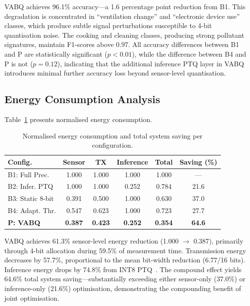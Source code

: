 VABQ achieves 96.1\% accuracy---a 1.6 percentage point reduction from B1. This degradation is concentrated in ``ventilation change'' and ``electronic device use'' classes, which produce subtle signal perturbations susceptible to 4-bit quantisation noise. The cooking and cleaning classes, producing strong pollutant signatures, maintain F1-scores above 0.97. All accuracy differences between B1 and P are statistically significant ($p < 0.01$), while the difference between B4 and P is not ($p = 0.12$), indicating that the additional inference PTQ layer in VABQ introduces minimal further accuracy loss beyond sensor-level quantisation.

\subsection{Energy Consumption Analysis}
\label{sec:res_energy}

Table~\ref{tab:energy} presents normalised energy consumption.

\begin{table}[H]
\centering
\caption{Normalised energy consumption and total system saving per configuration.}
\label{tab:energy}
\begin{tabular}{@{}lccccc@{}}
\toprule
\textbf{Config.} & \textbf{Sensor} & \textbf{TX} & \textbf{Inference} & \textbf{Total} & \textbf{Saving (\%)} \\
\midrule
B1: Full Prec.   & 1.000 & 1.000 & 1.000 & 1.000 & --- \\
B2: Infer. PTQ   & 1.000 & 1.000 & 0.252 & 0.784 & 21.6 \\
B3: Static 8-bit & 0.391 & 0.500 & 1.000 & 0.630 & 37.0 \\
B4: Adapt. Thr.  & 0.547 & 0.623 & 1.000 & 0.723 & 27.7 \\
\textbf{P: VABQ} & \textbf{0.387} & \textbf{0.423} & \textbf{0.252} & \textbf{0.354} & \textbf{64.6} \\
\bottomrule
\end{tabular}
\end{table}

VABQ achieves 61.3\% sensor-level energy reduction (1.000 $\rightarrow$ 0.387), primarily through 4-bit allocation during 59.5\% of measurement time. Transmission energy decreases by 57.7\%, proportional to the mean bit-width reduction (6.77/16 bits). Inference energy drops by 74.8\% from INT8 PTQ~\cite{smoothquant2024, palakodety2025tpu}. The compound effect yields 64.6\% total system saving---substantially exceeding either sensor-only (37.0\%) or inference-only (21.6\%) optimisation, demonstrating the compounding benefit of joint optimisation.

